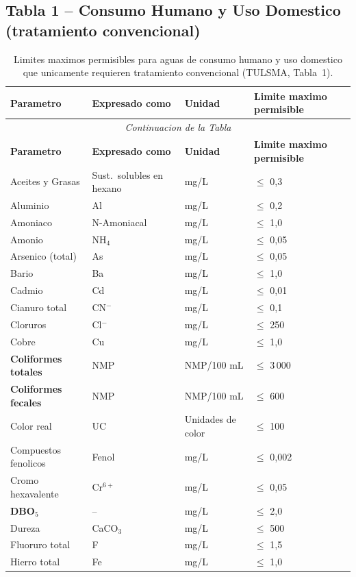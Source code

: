 \documentclass[12pt,a4paper]{article}
\begin{document}
\subsection{Tabla 1 -- Consumo Humano y Uso Domestico (tratamiento convencional)}
\small
\begin{longtable}{p{4.5cm}p{2.0cm}p{2.0cm}p{3.5cm}}
\caption{Limites maximos permisibles para aguas de consumo humano y uso domestico que unicamente requieren tratamiento convencional (TULSMA, Tabla~1).}\\
\toprule
\textbf{Parametro} & \textbf{Expresado como} & \textbf{Unidad} & \textbf{Limite maximo permisible} \\
\midrule
\endfirsthead
\multicolumn{4}{c}{\small\itshape Continuacion de la Tabla}\\
\toprule
\textbf{Parametro} & \textbf{Expresado como} & \textbf{Unidad} & \textbf{Limite maximo permisible} \\
\midrule
\endhead
\bottomrule
\endlastfoot
Aceites y Grasas & Sust.\ solubles en hexano & mg/L & $\leq$ 0,3 \\
Aluminio & Al & mg/L & $\leq$ 0,2 \\
Amoniaco & N-Amoniacal & mg/L & $\leq$ 1,0 \\
Amonio & NH$_4$ & mg/L & $\leq$ 0,05 \\
Arsenico (total) & As & mg/L & $\leq$ 0,05 \\
Bario & Ba & mg/L & $\leq$ 1,0 \\
Cadmio & Cd & mg/L & $\leq$ 0,01 \\
Cianuro total & CN$^-$ & mg/L & $\leq$ 0,1 \\
Cloruros & Cl$^-$ & mg/L & $\leq$ 250 \\
Cobre & Cu & mg/L & $\leq$ 1,0 \\
\textbf{Coliformes totales} & NMP & NMP/100 mL & $\leq$ 3\,000 \\
\textbf{Coliformes fecales} & NMP & NMP/100 mL & $\leq$ 600 \\
Color real & UC & Unidades de color & $\leq$ 100 \\
Compuestos fenolicos & Fenol & mg/L & $\leq$ 0,002 \\
Cromo hexavalente & Cr$^{6+}$ & mg/L & $\leq$ 0,05 \\
\textbf{DBO$_5$} & -- & mg/L & $\leq$ 2,0 \\
Dureza & CaCO$_3$ & mg/L & $\leq$ 500 \\
Fluoruro total & F & mg/L & $\leq$ 1,5 \\
Hierro total & Fe & mg/L & $\leq$ 1,0 \\

\end{longtable}
\end{document}
